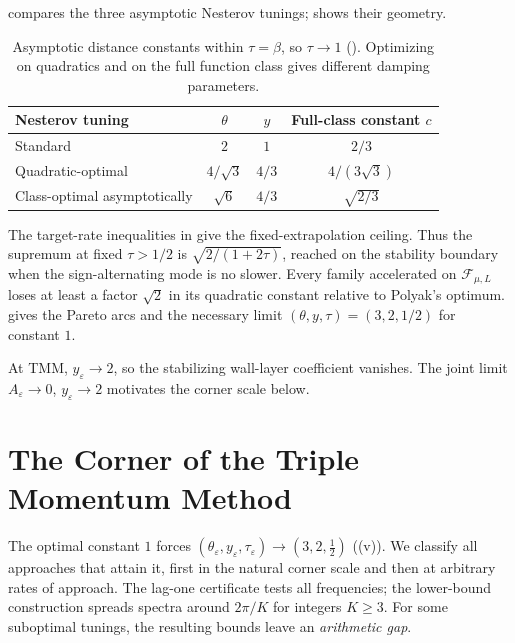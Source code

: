 \documentclass[11pt]{article}
\theoremstyle{definition}
\theoremstyle{remark}
\newcommand{\cF}{\mathcal F}
\begin{document}
 compares the three asymptotic Nesterov tunings;
 shows their geometry.

\begin{table}[t]
\centering
\begin{tabular}{lccc}
\toprule
Nesterov tuning & \(\theta\) & \(y\) & Full-class constant \(c\)\\
\midrule
Standard & \(2\) & \(1\) & \(2/3\)\\
Quadratic-optimal & \(4/\sqrt3\) & \(4/3\) & \(4/(3\sqrt3)\)\\
Class-optimal asymptotically & \(\sqrt6\) & \(4/3\) & \(\sqrt{2/3}\)\\
\bottomrule
\end{tabular}
\caption{Asymptotic distance constants within \(\tau=\beta\), so \(\tau\to1\)
().  Optimizing on quadratics and on the full function class
gives different damping parameters.}
\label{tab:nag-tunings}
\end{table}

The target-rate inequalities in  give the fixed-extrapolation ceiling.
Thus the supremum at fixed \(\tau>1/2\) is \(\sqrt{2/(1+2\tau)}\), reached on the stability boundary
when the sign-alternating mode is no slower.  Every family accelerated on \(\cF_{\mu,L}\)
loses at least a factor \(\sqrt2\) in its quadratic constant relative to Polyak's optimum.
 gives the Pareto arcs and the necessary limit
\((\theta,y,\tau)=(3,2,1/2)\) for constant \(1\).

At TMM, \(y_\varepsilon\to2\), so the stabilizing wall-layer coefficient vanishes.
The joint limit \(A_\varepsilon\to0\), \(y_\varepsilon\to2\) motivates the corner scale below.

%
\section{The Corner of the Triple Momentum Method}
\label{sec:TMM}
%

The optimal constant \(1\) forces \((\theta_\varepsilon,y_\varepsilon,\tau_\varepsilon)\to(3,2,\tfrac12)\)
((v)).  We classify all approaches that attain it, first in the
natural corner scale and then at arbitrary rates of approach.  The lag-one
certificate tests all frequencies; the lower-bound construction spreads spectra
around \(2\pi/K\) for integers \(K\ge3\).  For some suboptimal tunings, the resulting
bounds leave an \emph{arithmetic gap}.
\end{document}
